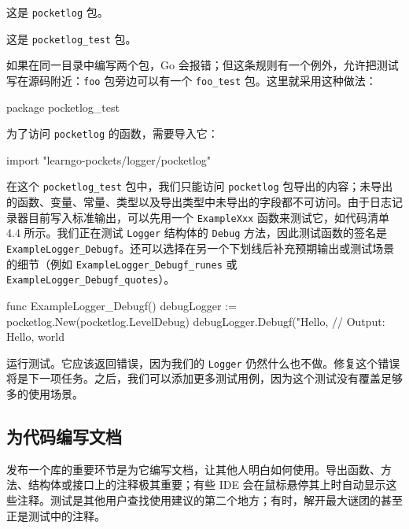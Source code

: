 \begin{codeannotations}
  \item 这是 \texttt{pocketlog} 包。
  \item 这是 \texttt{pocketlog\_test} 包。
\end{codeannotations}

如果在同一目录中编写两个包，Go 会报错；但这条规则有一个例外，允许把测试写在源码附近：\texttt{foo} 包旁边可以有一个 \texttt{foo\_test} 包。这里就采用这种做法：

\begin{gocode}[]
package pocketlog_test
\end{gocode}

为了访问 \texttt{pocketlog} 的函数，需要导入它：

\begin{gocode}[]
import "learngo-pockets/logger/pocketlog"
\end{gocode}

在这个 \texttt{pocketlog\_test} 包中，我们只能访问 \texttt{pocketlog} 包导出的内容；未导出的函数、变量、常量、类型以及导出类型中未导出的字段都不可访问。由于日志记录器目前写入标准输出，可以先用一个 \texttt{ExampleXxx} 函数来测试它，如代码清单 4.4 所示。我们正在测试 \texttt{Logger} 结构体的 \texttt{Debug}
方法，因此测试函数的签名是 \texttt{ExampleLogger\_Debugf}。还可以选择在另一个下划线后补充预期输出或测试场景的细节（例如 \texttt{ExampleLogger\_Debugf\_runes} 或 \texttt{ExampleLogger\_Debugf\_quotes}）。

\begin{gocode}[title={代码清单 4.4 \texttt{logger\_test.go}：测试标准输出}]
func ExampleLogger_Debugf() {
    debugLogger := pocketlog.New(pocketlog.LevelDebug)
    debugLogger.Debugf("Hello, %
    // Output: Hello, world
}
\end{gocode}

运行测试。它应该返回错误，因为我们的 \texttt{Logger} 仍然什么也不做。修复这个错误将是下一项任务。之后，我们可以添加更多测试用例，因为这个测试没有覆盖足够多的使用场景。

\subsection{为代码编写文档}

发布一个库的重要环节是为它编写文档，让其他人明白如何使用。导出函数、方法、结构体或接口上的注释极其重要；有些 IDE 会在鼠标悬停其上时自动显示这些注释。测试是其他用户查找使用建议的第二个地方；有时，解开最大谜团的甚至正是测试中的注释。

